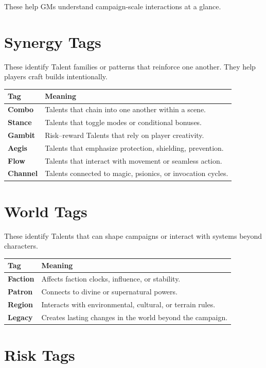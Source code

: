 \documentclass[11pt]{book}
\begin{document}
These help GMs understand campaign-scale interactions at a glance.

\section{Synergy Tags}

These identify Talent families or patterns that reinforce one another.
They help players craft builds intentionally.

\begin{longtable}{|p{3cm}|p{9cm}|}
\hline
\textbf{Tag} & \textbf{Meaning} \\ \hline
\textbf{Combo} & Talents that chain into one another within a scene. \\ \hline
\textbf{Stance} & Talents that toggle modes or conditional bonuses. \\ \hline
\textbf{Gambit} & Risk--reward Talents that rely on player creativity. \\ \hline
\textbf{Aegis} & Talents that emphasize protection, shielding, prevention. \\ \hline
\textbf{Flow} & Talents that interact with movement or seamless action. \\ \hline
\textbf{Channel} & Talents connected to magic, psionics, or invocation cycles. \\ \hline
\end{longtable}

\section{World Tags}

These identify Talents that can shape campaigns or interact with systems beyond characters.

\begin{longtable}{|p{3cm}|p{9cm}|}
\hline
\textbf{Tag} & \textbf{Meaning} \\ \hline
\textbf{Faction} & Affects faction clocks, influence, or stability. \\ \hline
\textbf{Patron} & Connects to divine or supernatural powers. \\ \hline
\textbf{Region} & Interacts with environmental, cultural, or terrain rules. \\ \hline
\textbf{Legacy} & Creates lasting changes in the world beyond the campaign. \\ \hline
\end{longtable}

\section{Risk Tags}
\end{document}
